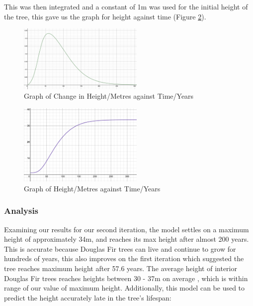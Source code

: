 \documentclass[twocolumn]{article} %
\begin{document}
This was then integrated and a constant of 1m was used for the initial height of the tree, this gave us the graph for height against time (Figure \ref{fig:2ndint}).

\begin{figure}[htp]
    \centering
    \includegraphics[width=6cm]{Figures/Figure3}
    \caption{Graph of Change in Height/Metres against Time/Years}
    \label{fig:2nddiff}
\end{figure}


\begin{figure}[htp]
    \centering
    \includegraphics[width=6cm]{Figures/Figure4}
    \caption{Graph of Height/Metres against Time/Years}
    \label{fig:2ndint}
\end{figure}


\subsubsection{Analysis}

Examining our results for our second iteration, the model settles on a maximum height of approximately 34m, and reaches its max height after almost 200 years. This is accurate because Douglas Fir trees can live and continue to grow for hundreds of years, this also improves on the first iteration which suggested the tree reaches maximum height after 57.6 years. The average height of interior Douglas Fir trees reaches heights between 30 - 37m on average \cite{three}, which is within range of  our value of maximum height. Additionally, this model can be used to predict the height accurately late in the tree’s lifespan:
\end{document}
